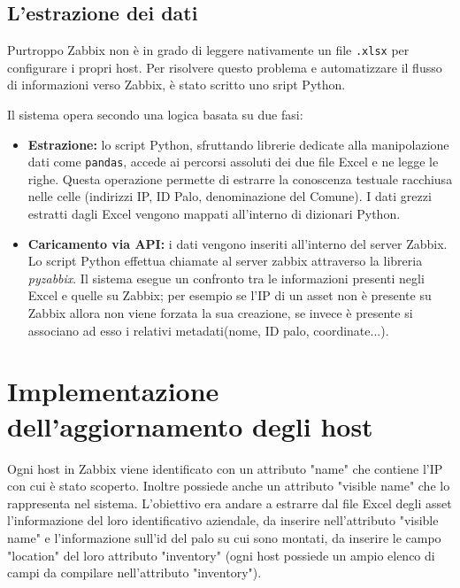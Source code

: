 \documentclass[12pt, a4paper, oneside]{report}
\begin{document}
\subsection{L'estrazione dei dati}
Purtroppo Zabbix non è in grado di leggere nativamente un file \texttt{.xlsx} per configurare i propri host. Per risolvere questo problema e automatizzare il flusso di informazioni verso Zabbix, è stato scritto uno sript Python.

Il sistema opera secondo una logica basata su due fasi:
\begin{itemize}
    \item \textbf{Estrazione:} lo script Python, sfruttando  librerie dedicate alla manipolazione dati come \texttt{pandas}, accede ai percorsi assoluti dei due file Excel e ne legge le righe. Questa operazione permette di estrarre la conoscenza testuale racchiusa nelle celle (indirizzi IP, ID Palo, denominazione del Comune). I dati grezzi estratti dagli Excel vengono mappati all'interno di dizionari Python. %
    \item \textbf{Caricamento via API:} i dati vengono inseriti all'interno del server Zabbix. Lo script Python effettua chiamate al server zabbix attraverso la libreria \emph{pyzabbix}. Il sistema esegue un confronto tra le informazioni presenti negli Excel e quelle su Zabbix; per esempio se l'IP di un asset non è presente su Zabbix allora non viene forzata la sua creazione, se invece è presente si associano ad esso i relativi metadati(nome, ID palo, coordinate...).
\end{itemize}

\section{Implementazione dell'aggiornamento degli host}

Ogni host in Zabbix viene identificato con un attributo "name" che contiene l'IP con cui è stato scoperto.
Inoltre possiede anche un attributo "visible name" che lo rappresenta nel sistema. L'obiettivo era andare a estrarre
dal file Excel degli asset l'informazione del loro identificativo aziendale, da inserire nell'attributo "visible name"
e l'informazione sull'id del palo su cui sono montati, da inserire le campo "location" del loro attributo
"inventory" (ogni host possiede un ampio elenco di campi da compilare nell'attributo "inventory").
\end{document}
